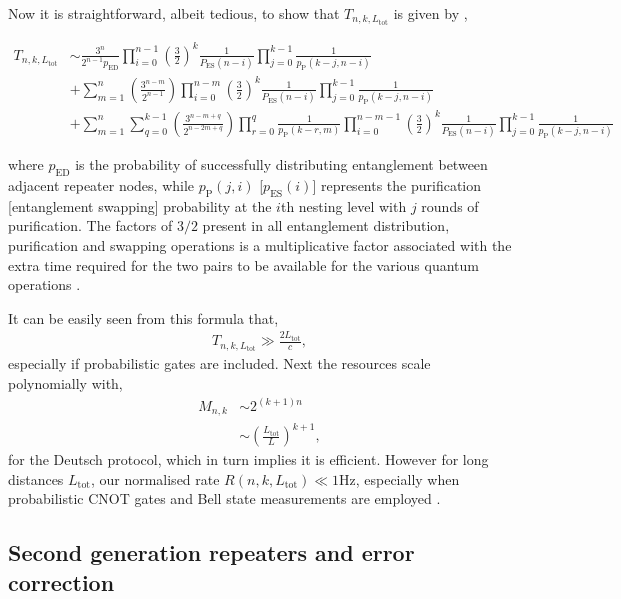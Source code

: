 \documentclass[twocolumn, aps, rmp, amsmath, amssymb, nofootinbib, superscriptaddress, longbibliography, floatfix, table-of-contents, eqsecnum]{revtex4-1}
\begin{document}
Now it is straightforward, albeit tedious, to show that $T_{n,k,L_\mathrm{tot}}$ is given by \cite{bib:braztzik2013},
\begin{widetext}
\begin{align*}
 T_{n,k,L_\mathrm{tot}} &\sim \frac{3^n}{2^{n-1} p_\mathrm{ED}} \prod_{i=0}^{n-1} \left(\frac{3}{2}\right)^{k}  \frac{1}{P_\mathrm{ES}(n-i)  }\prod_{j=0}^{k-1} \frac{1}{p_\mathrm{P}(k-j,n-i)}  \nonumber \\
 &+\sum_{m=1}^n\left(\frac{3^{n-m}}{2^{n-1}}\right) \prod_{i=0}^{n-m}   \left(\frac{3}{2}\right)^{k} \frac{1}{P_\mathrm{ES}(n-i)}  \prod_{j=0}^{k-1}  \frac{1}{p_\mathrm{P}(k-j,n-i)}  \\
&+\sum_{m=1}^n {\sum_{q=0}^{k-1} \left(\frac{3^{n-m+q}}{2^{n- 2 m+q}}\right) \prod_{r=0}^{q}\frac{1}{p_\mathrm{P}(k-r,m)}} 
\prod_{i=0}^{n-m-1}   \left(\frac{3}{2}\right)^{k} \frac{1}{P_\mathrm{ES}(n-i)}  \prod_{j=0}^{k-1}  \frac{1}{p_\mathrm{P}(k-j,n-i)} \nonumber 
\end{align*}
\end{widetext}
where $p_\mathrm{ED}$ is the probability of successfully distributing entanglement between adjacent repeater nodes, while $p_\mathrm{P}(j,i)$ [$p_\mathrm{ES}(i)$] represents the purification [entanglement swapping] probability at the $i$th nesting level with $j$ rounds of purification. The factors of $3/2$ present in all entanglement distribution, purification and swapping operations is a multiplicative factor associated with the extra time required for the two pairs to be available for the various quantum operations \cite{bib:SSRG09}.

It can be easily seen from this formula that,
\begin{align}
	T_{n,k,L_\mathrm{tot}} \gg \frac{2 L_\mathrm{tot}}{c},
\end{align}
especially if probabilistic gates are included. Next the resources scale polynomially with,
\begin{align}
	M_{n,k} &\sim 2^{(k+1)n}\nonumber\\
	&\sim \left(\frac{L_\mathrm{tot}}{L}\right)^{k+1},
\end{align}
for the Deutsch protocol, which in turn implies it is efficient. However for long distances $L_\mathrm{tot}$, our normalised rate \mbox{$R(n,k,L_\mathrm{tot})\ll 1\mathrm{Hz}$}, especially when probabilistic CNOT gates and Bell state measurements are employed \cite{bib:jiang09, munro10}.

\subsection{Second generation repeaters and error correction}
\end{document}
